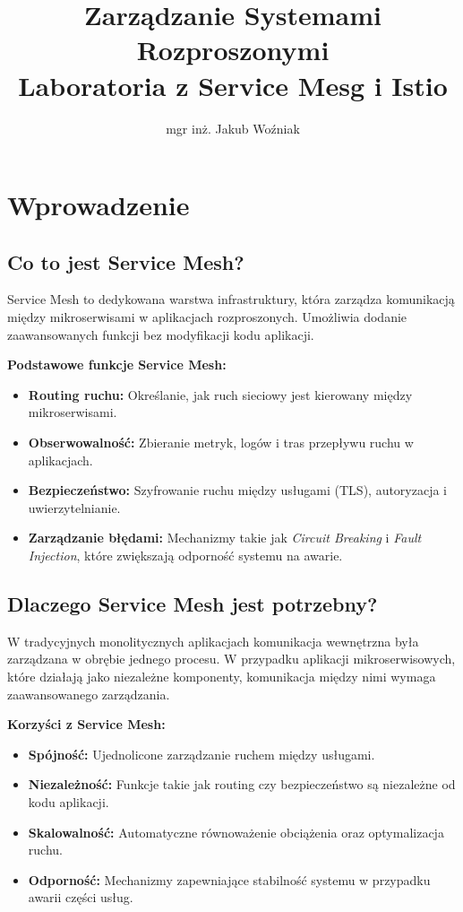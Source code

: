 \documentclass{article}
\title{Zarządzanie Systemami Rozproszonymi\\Laboratoria z Service Mesg i Istio}
\author{mgr inż. Jakub Woźniak}
\date{}
\begin{document}
\maketitle
\section{Wprowadzenie}

\subsection{Co to jest Service Mesh?}

Service Mesh to dedykowana warstwa infrastruktury, która zarządza komunikacją między mikroserwisami w aplikacjach rozproszonych. Umożliwia dodanie zaawansowanych funkcji bez modyfikacji kodu aplikacji.

\textbf{Podstawowe funkcje Service Mesh:}
\begin{itemize}
    \item \textbf{Routing ruchu:} Określanie, jak ruch sieciowy jest kierowany między mikroserwisami.
    \item \textbf{Obserwowalność:} Zbieranie metryk, logów i tras przepływu ruchu w aplikacjach.
    \item \textbf{Bezpieczeństwo:} Szyfrowanie ruchu między usługami (TLS), autoryzacja i uwierzytelnianie.
    \item \textbf{Zarządzanie błędami:} Mechanizmy takie jak \textit{Circuit Breaking} i \textit{Fault Injection}, które zwiększają odporność systemu na awarie.
\end{itemize}

\subsection{Dlaczego Service Mesh jest potrzebny?}

W tradycyjnych monolitycznych aplikacjach komunikacja wewnętrzna była zarządzana w obrębie jednego procesu. W przypadku aplikacji mikroserwisowych, które działają jako niezależne komponenty, komunikacja między nimi wymaga zaawansowanego zarządzania.

\textbf{Korzyści z Service Mesh:}
\begin{itemize}
    \item \textbf{Spójność:} Ujednolicone zarządzanie ruchem między usługami.
    \item \textbf{Niezależność:} Funkcje takie jak routing czy bezpieczeństwo są niezależne od kodu aplikacji.
    \item \textbf{Skalowalność:} Automatyczne równoważenie obciążenia oraz optymalizacja ruchu.
    \item \textbf{Odporność:} Mechanizmy zapewniające stabilność systemu w przypadku awarii części usług.
\end{itemize}
\end{document}
